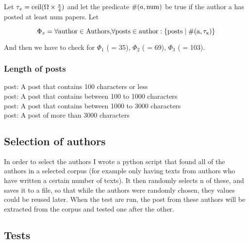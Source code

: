Let $\tau_x = \rm{ceil}(\Omega \times \frac{x}{4})$ and let the predicate $\#(a, \rm{num})$ be true if the author a has posted at least num papers. Let 

$$\Phi_x = \forall\rm{ author }\in\rm{ Authors, }\forall\rm{ posts }\in\rm{ author }: \{\rm{posts }\mid \#(a, \tau_x)\}$$ 
 
And then we have to check for $\Phi_1$ ( = 35), $\Phi_2$ ( = 69), $\Phi_3$ ( = 103).

\subsubsection*{Length of posts}
 post: A post that contains 100 characters or less\\
 post: A post that contains between 100 to 1000 characters\\
 post: A post that contains between 1000 to 3000 characters\\
 post: A post of more than 3000 characters


\subsection{Selection of authors}
In order to select the authors I wrote a python script that found all of the authors in a selected corpus (for example only having texts from authors who have written a certain number of texts). It then randomly selects n of these, and saves it to a file, so that while the authors were randomly chosen, they values could be reused later. When the test are run, the post from these authors will be extracted from the corpus and tested one after the other.


\subsection{Tests}



